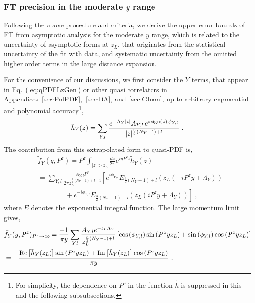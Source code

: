 \documentclass[a4paper,11pt]{article}
\begin{document}
\subsubsection{FT precision in the moderate $y$ range}\label{sec:FTerrmy}
Following the above procedure and criteria, we derive the upper error bounds of FT from asymptotic analysis for the moderate $y$ range, which is related to the uncertainty of asymptotic forms at $z_L$, that originates from the statistical uncertainty of the fit with data, and systematic uncertainty from the omitted higher order terms in the large distance expansion. 

For the convenience of our discussions, we first consider the $Y$ terms, that appear in Eq.~(\ref{eq:qPDFLzGen}) or other quasi correlators in Appendices~\ref{sec:PolPDF},~\ref{sec:DA}, and~\ref{sec:Gluon}, up to arbitrary exponential and polynomial accuracy\footnote{For simplicity, the dependence on $P^z$ in the function $\tilde{h}$ is suppressed in this and the following subsubsections.}, 
\begin{align}
\tilde{h}_{Y}(z) = \sum_{Y,l} \frac{e^{-\Lambda_Y |z|} A_{Y,l} \, e^{i \, {\rm sign}(z) \, \phi_{Y,l}}}{|z|^{\frac{3}{2}(N_Y-1)+l}}  \ .
\end{align}
The contribution from this extrapolated form to quasi-PDF is,
\begin{align}
&\tilde f_{Y}(y,P^z) = P^z \int_{|z|>z_L} \frac{d z}{2\pi} e^{i y P^z z} \tilde{h}_{Y}(z) 
\nonumber\\
&=  \sum_{Y,l} \frac{A_{Y,l} P^z}{2 \pi z_L^{\frac{3}{2}(N_Y-1)+l-1}}  \left[e^{i \phi _{Y,l}} E_{\frac{3}{2}(N_Y-1)+l}\left(z_L \left(-i P^z y+\Lambda_{Y}\right)\right) \right. \nonumber\\
&\left.\quad\quad\quad\quad + e^{-i \phi _{Y,l}} E_{\frac{3}{2}(N_Y-1)+l}\left(z_L \left(i P^z y+\Lambda_{Y}\right)\right)\right] \ ,
\end{align}
where $E$ denotes the exponential integral function. 
The large momentum limit gives,
\begin{align}\label{eq:fYLM}
&\tilde f_{Y}(y,P^z)_{P^z \rightarrow\infty} = \frac{-1}{\pi  y} \sum_{Y,l} \frac{A_{Y,l} e^{-z_L \Lambda_{Y}}}{z_L^{\frac{3}{2}(N_Y-1)+l}} \left[\cos \left(\phi_{Y,l}\right) \sin \left(P^z y z_L\right)+\sin \left(\phi_{Y,l}\right) \cos \left(P^z y z_L\right) \right] \nonumber\\
&=-\frac{{\rm Re}\left[\tilde{h}_Y(z_L)\right] \sin \left(P^z y z_L\right) + {\rm Im}\left[\tilde{h}_Y(z_L)\right] \cos \left(P^z y z_L\right)}{\pi y} \ .
\end{align}
\end{document}
